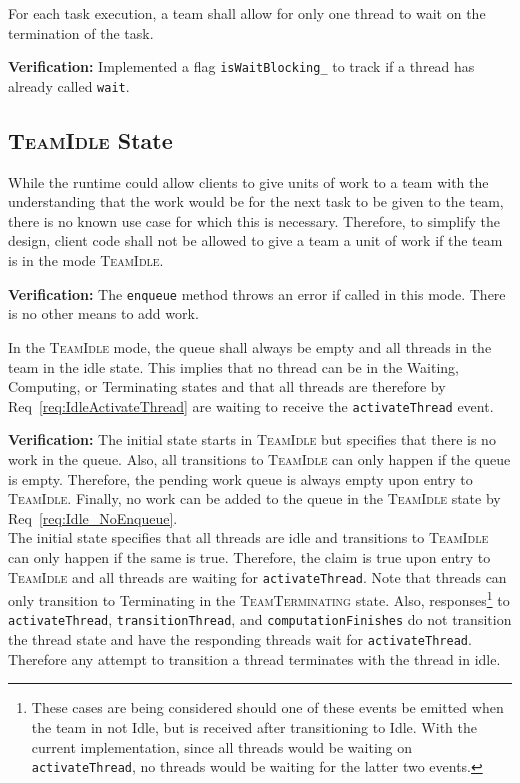 \documentclass{article}
\newcommand{\TeamIdle}          {\textsc{TeamIdle}}
\newcommand{\TeamTerminating}   {\textsc{TeamTerminating}}
\begin{document}
\begin{req}
\label{req:Runtime_OneWait}
For each task execution, a team shall allow for only one thread to wait on the
termination of the task.
\end{req}
\textbf{Verification:}\hspace{0.125in}  Implemented a flag
\texttt{isWaitBlocking\_} to track if a thread has already called \texttt{wait}.

\subsection{{\TeamIdle} State}

\begin{req}
\label{req:Idle_NoEnqueue}
While the runtime could allow clients to give units of work to a team with the
understanding that the work would be for the next task to be given to the team,
there is no known use case for which this is necessary.  Therefore, to simplify
the design, client code shall not be allowed to give a team a unit of work if
the team is in the mode \TeamIdle.  
\end{req}
\textbf{Verification:}\hspace{0.125in}  The \texttt{enqueue} method throws an
error if called in this mode.  There is no other means to add work.\\ 

\begin{req}
In the {\TeamIdle} mode, the queue shall always be empty and all threads in the
team in the idle state.  This implies that no thread can be in the Waiting,
Computing, or Terminating states and that all threads are therefore by
Req~\ref{req:IdleActivateThread} are waiting to receive the
\texttt{activateThread} event.
\end{req}
\textbf{Verification:}\hspace{0.125in}  The initial state starts in {\TeamIdle}
but specifies that there is no work in the queue.  Also, all transitions to
{\TeamIdle} can only happen if the queue is empty.  Therefore, the pending work
queue is always empty upon entry to \TeamIdle.  Finally, no work can be added
to the queue in the {\TeamIdle} state by Req~\ref{req:Idle_NoEnqueue}.\\

The initial state specifies that all threads are idle and transitions to
{\TeamIdle} can only happen if the same is true.  Therefore, the claim is true
upon entry to {\TeamIdle} and all threads are waiting for \texttt{activateThread}.
Note that threads can only transition to Terminating in the {\TeamTerminating} 
state.  Also, responses\footnote{These cases are being considered should one of
these events be emitted when the team in not Idle, but is received after
transitioning to Idle.  With the current implementation, since all threads would
be waiting on \texttt{activateThread}, no threads would be waiting for the
latter two events.} to \texttt{activateThread}, \texttt{transitionThread}, and
\texttt{computationFinishes} do not transition the thread state and have the
responding threads wait for \texttt{activateThread}.  Therefore any attempt to
transition a thread terminates with the thread in idle.\\
\end{document}
